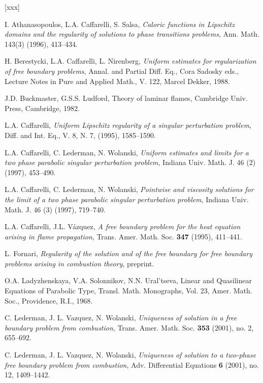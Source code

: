 \begin{thebibliography}{[xxx]}

 I. Athanasopoulos, L.A. Caffarelli, S. Salsa, {\it Caloric 
functions in Lipschitz domains and the regularity of solutions to phase 
transitions problems}, Ann. Math. 143(3) (1996), 413--434.

 H. Berestycki, L.A. Caffarelli, L. Nirenberg, 
{\it Uniform estimates for regularization of free boundary problems}, Annal. 
and Partial Diff. Eq., Cora Sadosky eds., Lecture Notes in Pure and Applied 
Math., V. 122, Marcel Dekker, 1988.

 J.D. Buckmaster, G.S.S. Ludford, Theory of laminar flames, 
Cambridge Univ. Press, Cambridge, 1982.

 L.A. Caffarelli, {\it Uniform Lipschitz regularity of a 
singular perturbation problem}, Diff. and Int. Eq., V. 8, N. 7, (1995), 
1585--1590.

 L.A. Caffarelli, C. Lederman, N. Wolanski, {\it Uniform 
estimates and limits for a two phase parabolic singular perturbation
problem}, Indiana Univ. Math. J. 46 (2) (1997), 453--490.

 L.A. Caffarelli, C. Lederman, N. Wolanski, {\it Pointwise 
and viscosity solutions for the limit of a two phase parabolic singular 
perturbation problem}, Indiana Univ. Math. J. 46 (3) (1997), 719--740.

 L.A. Caffarelli, J.L. V\'azquez, {\it A free boundary 
problem for the heat equation arising in flame propagation}, Trans. Amer. 
Math. Soc. {\bf 347} (1995), 411--441.

 L. Fornari, {\it Regularity of the solution and of the free 
boundary for free boundary problems arising in combustion theory}, preprint.


 O.A. Ladyzhenskaya, V.A. Solonnikov, N.N. Ural'tseva, 
Linear and Quasilinear Equations of Parabolic Type, Transl. Math. 
Monographs, Vol. 23, Amer. Math. Soc., Providence, R.I., 1968.

 C. Lederman, J. L. Vazquez, N. Wolanski, {\it Uniqueness
of solution in a free boundary problem from combustion}, Trans. Amer. Math. Soc. {\bf 353} (2001), no. 2, 655--692.

 C. Lederman, J. L. Vazquez, N. Wolanski, {\it Uniqueness
of solution to a two-phase free boundary problem from combustion}, Adv. Differential
Equations {\bf 6} (2001), no. 12, 1409--1442.


\end{thebibliography}
